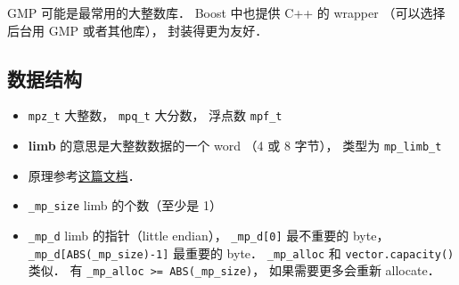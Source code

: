
GMP 可能是最常用的大整数库． Boost 中也提供 C++ 的 wrapper （可以选择后台用 GMP 或者其他库）， 封装得更为友好．

\subsection{数据结构}
\begin{itemize}
\item \verb|mpz_t| 大整数， \verb|mpq_t| 大分数， 浮点数 \verb|mpf_t|
\item \textbf{limb} 的意思是大整数数据的一个 word （4 或 8 字节）， 类型为 \verb|mp_limb_t|
\item 原理参考\href{https://gmplib.org/manual/Integer-Internals#Integer-Internals}{这篇文档}．
\item \verb|_mp_size| limb 的个数（至少是 1）
\item \verb|_mp_d| limb 的指针（little endian）， \verb|_mp_d[0]| 最不重要的 byte， \verb|_mp_d[ABS(_mp_size)-1]| 最重要的 byte．
\verb|_mp_alloc| 和 \verb|vector.capacity()| 类似． 有 \verb|_mp_alloc >= ABS(_mp_size)|， 如果需要更多会重新 allocate．
\end{itemize}


